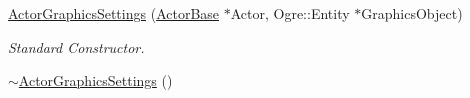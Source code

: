 \begin{DoxyCompactItemize}
\item 
\hyperlink{classphys_1_1ActorGraphicsSettings_a33472d07ddaaf630e4e7b8c94190df0a}{ActorGraphicsSettings} (\hyperlink{classphys_1_1ActorBase}{ActorBase} $\ast$Actor, Ogre::Entity $\ast$GraphicsObject)
\begin{DoxyCompactList}\small\item\em Standard Constructor. \item\end{DoxyCompactList}\item 
\hypertarget{classphys_1_1ActorGraphicsSettings_a3c6f9f1dd5bcceda2db65f1514313e14}{
\hyperlink{classphys_1_1ActorGraphicsSettings_a3c6f9f1dd5bcceda2db65f1514313e14}{$\sim$ActorGraphicsSettings} ()}
\label{classphys_1_1ActorGraphicsSettings_a3c6f9f1dd5bcceda2db65f1514313e14}


\end{DoxyCompactItemize}
